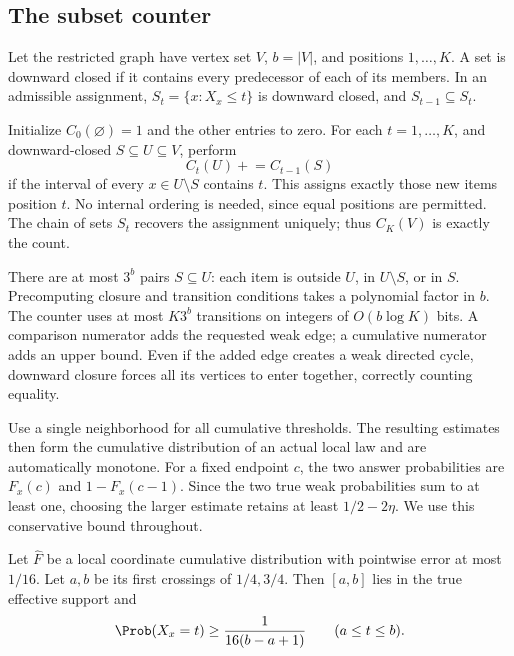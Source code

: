 \subsection{The subset counter}
\label{sec:counter}

Let the restricted graph have vertex set $V$, $b=|V|$, and positions
$1,\ldots,K$. A set is downward closed if it contains every predecessor
of each of its members. In an admissible assignment,
$S_t=\{x:X_x\leq t\}$ is downward closed, and $S_{t-1}\subseteq S_t$.

Initialize $C_0(\varnothing)=1$ and the other entries to zero.
For each $t=1,\ldots,K$, and downward-closed $S\subseteq U\subseteq V$,
perform
\begin{equation}
                         C_t(U)\mathrel{+}=C_{t-1}(S)
\label{eq:dp}
\end{equation}
if the interval of every $x\in U\setminus S$ contains $t$.
This assigns exactly those new items position $t$. No internal ordering
is needed, since equal positions are permitted. The chain of sets $S_t$
recovers the assignment uniquely; thus $C_K(V)$ is exactly the count.

There are at most $3^b$ pairs $S\subseteq U$: each item is outside $U$,
in $U\setminus S$, or in $S$. Precomputing closure and transition conditions
takes a polynomial factor in $b$. The counter uses at most $K3^b$
transitions on integers of $O(b\log K)$ bits. A comparison numerator adds
the requested weak edge; a cumulative numerator adds an upper bound.
Even if the added edge creates a weak directed cycle, downward closure
forces all its vertices to enter together, correctly counting equality.

Use a single neighborhood for all cumulative thresholds. The resulting
estimates then form the cumulative distribution of an actual local law and
are automatically monotone. For a fixed endpoint $c$, the two answer
probabilities are $F_x(c)$ and $1-F_x(c-1)$.
Since the two true weak probabilities sum to at least one, choosing the
larger estimate retains at least $1/2-2\eta$. We use this conservative
bound throughout.

\begin{lemma}
\label{lem:quartiles}
Let $\widehat F$ be a local coordinate cumulative distribution with pointwise
error at most $1/16$. Let $a,b$ be its first crossings of $1/4,3/4$.
Then $[a,b]$ lies in the true effective support and
\[
                   \Prob(X_x=t)\geq\frac{1}{16(b-a+1)}
                   \qquad(a\leq t\leq b).
\]
\end{lemma}

